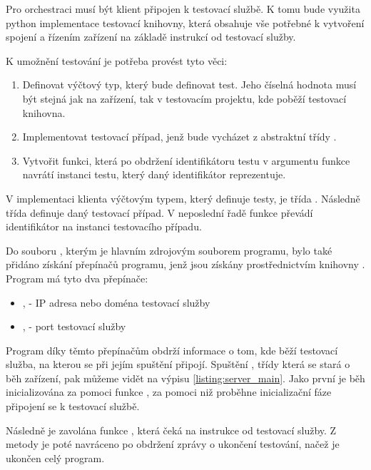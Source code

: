 Pro orchestraci musí být klient připojen k testovací službě. K tomu bude využita python implementace testovací knihovny, která obsahuje vše potřebné k vytvoření spojení a řízením zařízení na základě instrukcí od testovací služby. 

K umožnění testování je potřeba provést tyto věci:

\begin{enumerate}
    \item Definovat výčtový typ, který bude definovat test. Jeho číselná hodnota musí být stejná jak na zařízení, tak v testovacím projektu, kde poběží testovací knihovna.
    \item Implementovat testovací případ, jenž bude vycházet z abstraktní třídy .
    \item Vytvořit funkci, která po obdržení identifikátoru testu v argumentu funkce navrátí instanci testu, který daný identifikátor reprezentuje.
\end{enumerate}


V implementaci klienta výčtovým typem, který definuje testy, je třída . Následně třída  definuje daný testovací případ. V neposlední řadě funkce  převádí identifikátor na instanci testovacího případu. 

Do souboru , kterým je hlavním zdrojovým souborem programu, bylo také přidáno získání přepínačů programu, jenž jsou získány prostřednictvím knihovny . Program má tyto dva přepínače:

\begin{itemize}
    \item {},  - IP adresa nebo doména testovací služby
    \item {},  - port testovací služby
\end{itemize}

Program díky těmto přepínačům obdrží informace o tom, kde běží testovací služba, na kterou se při jejím spuštění připojí. Spuštění , třídy která se stará o běh zařízení, pak můžeme vidět na výpisu \ref{listing:server_main}. Jako první je běh inicializována za pomoci funkce , za pomoci niž proběhne inicializační fáze připojení se k testovací službě. 

Následně je zavolána funkce , která čeká na instrukce od testovací služby. Z metody je poté navráceno po obdržení zprávy o ukončení testování, načež je ukončen celý program. 



